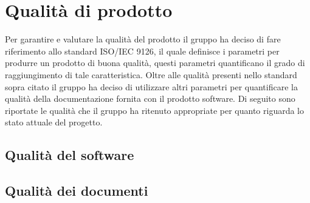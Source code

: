 \section{Qualità di prodotto}
	Per garantire e valutare la qualità del prodotto il gruppo ha deciso di fare riferimento allo standard ISO/IEC 9126, il quale definisce i parametri per produrre un prodotto di buona qualità, questi parametri quantificano il grado di raggiungimento di tale caratteristica. Oltre alle qualità presenti nello standard sopra citato il gruppo ha deciso di utilizzare altri parametri per quantificare la qualità della documentazione fornita con il prodotto software. Di seguito sono riportate le qualità che il gruppo ha ritenuto appropriate per quanto riguarda lo stato attuale del progetto.
	\subsection{Qualità del software}
		
		
		
		
		
	\subsection{Qualità dei documenti}
		
